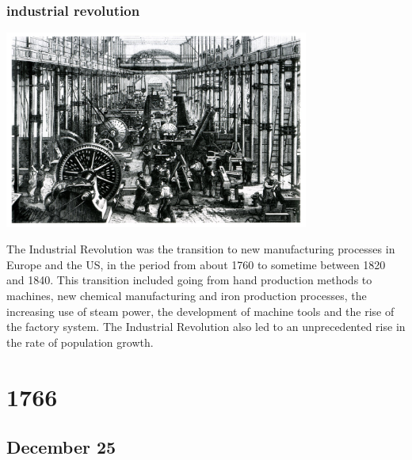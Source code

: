 \documentclass[11pt]{report}
\begin{document}
\subsection{industrial revolution}
\vspace{2mm}\begin{center}\includegraphics[width=10cm]{./img/industrevolution.jpg}\end{center}
The Industrial Revolution was the transition to new manufacturing processes in Europe and the US, in the period from about 1760 to sometime between 1820 and 1840. This transition included going from hand production methods to machines, new chemical manufacturing and iron production processes, the increasing use of steam power, the development of machine tools and the rise of the factory system. The Industrial Revolution also led to an unprecedented rise in the rate of population growth.

\chapter{1766}
\section{December 25}
\end{document}

